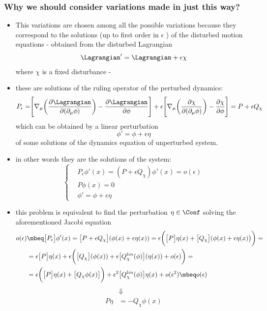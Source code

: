\documentclass[a4paper,11pt]{scrartcl}
\begin{document}
       \subsubsection*{ Why we should consider variations made in just this way?}
    \begin{itemize}
        \item This variations are chosen among all the possible variations because they correspond to the solutions (up to first order in $\epsilon$ ) of the disturbed motion equations
           - obtained from the disturbed Lagrangian
           $$\Lagrangian' = \Lagrangian  + \epsilon \chi $$
           where $\chi$ is a fixed disturbance - 
           \item these are solutions of the ruling operator of the perturbed dynamics:
        $$ P_\epsilon = \Biggr[ \nabla_\mu \biggr( \frac{\partial \Lagrangian}{\partial(\partial_\mu \phi)} \biggr) - \frac{\partial \Lagrangian}{\partial \phi} \Biggr] + \epsilon \Biggr[ \nabla_\mu \biggr( \frac{\partial \chi}{\partial(\partial_\mu \phi)} \biggr) - \frac{\partial \chi}{\partial \phi} \Biggr]
            = P + \epsilon Q_\chi        $$
           which can be obtained by a linear perturbation 
           $$ \phi' = \phi + \epsilon \eta$$
           of some solutions of the dynamics equation of unperturbed system. \\
           \item in other words they are the solutions of the system:
               \begin{displaymath}
                      \begin{cases} 
                      & P_\epsilon \phi'(x) = (P + \epsilon Q_\chi ) \phi'(x) = o(\epsilon)  \\ 
                    & P \phi(x) = 0 \\
                    & \phi' = \phi + \epsilon \eta
                \end{cases}             
               \end{displaymath}
           \item this problem is equivalent to find the perturbation $\eta \in \Conf$ solving the aforementioned Jacobi equation
           \begin{align*}
            o(\epsilon) &\mbeq \big[P_\epsilon\big] \phi'(x) =  \big[ P + \epsilon Q_\chi        \big]( \phi(x) + \epsilon \eta(x)) 
            = \epsilon \biggr( \big[P\big] \eta(x) + \big[Q_\chi \big]( \phi(x) + \epsilon \eta(x)\big)\biggr) = \\
            & =  \epsilon  \big[P\big] \eta(x) + \epsilon \biggr( \big[Q_\chi \big]( \phi(x)) + \epsilon \big[Q_\chi^{lin}(\phi)  \big]( \eta(x)) + o(\epsilon) \biggr) = \\
            & = \epsilon \biggr( \big[P\big] \eta(x) + \big[Q_\chi \phi(x) \big]\biggr)+ \epsilon^2 \big[Q_\chi^{lin}(\phi)  \big]    \eta(x) + o(\epsilon^ 2) \mbeq o(\epsilon)
           \end{align*}
           \begin{align*}
                       & \Downarrow \\
             P \eta &= - Q_\chi \phi(x)
           \end{align*}
           

\end{itemize}
\end{document}
